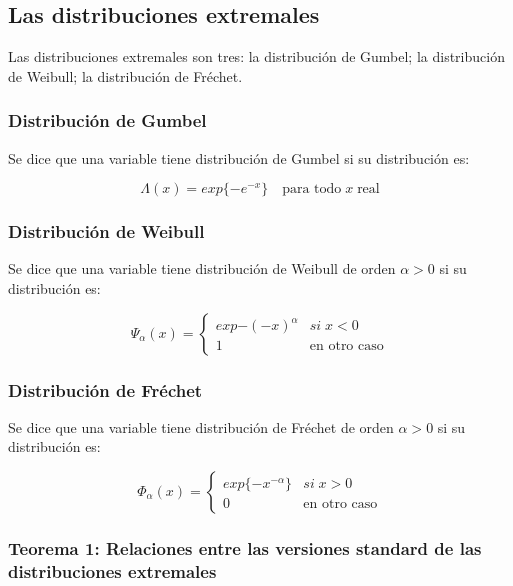 \documentclass[
  12pt]{article}
\begin{document}
\newpage

\hypertarget{las-distribuciones-extremales}{%
\subsection{Las distribuciones
extremales}\label{las-distribuciones-extremales}}

Las distribuciones extremales son tres: la distribución de Gumbel; la
distribución de Weibull; la distribución de Fréchet.

\hypertarget{distribuciuxf3n-de-gumbel}{%
\subsubsection{Distribución de Gumbel}\label{distribuciuxf3n-de-gumbel}}

Se dice que una variable tiene distribución de Gumbel si su distribución
es:

\[ \Lambda(x) = exp\{-e^{-x}\} \quad\text{para todo}\; x \;\text{real} \]

\hypertarget{distribuciuxf3n-de-weibull}{%
\subsubsection{Distribución de
Weibull}\label{distribuciuxf3n-de-weibull}}

Se dice que una variable tiene distribución de Weibull de orden
\(\alpha>0\) si su distribución es:

\[\Psi_{\alpha}(x)=\begin{cases}
exp{-(-x)^{\alpha}} & si\;x<0\\
1 & \text{en otro caso}
\end{cases}\]

\hypertarget{distribuciuxf3n-de-fruxe9chet}{%
\subsubsection{Distribución de
Fréchet}\label{distribuciuxf3n-de-fruxe9chet}}

Se dice que una variable tiene distribución de Fréchet de orden
\(\alpha>0\) si su distribución es:

\[
\Phi_{\alpha}(x)=\begin{cases}
exp\{-x^{-\alpha}\} & si\;x>0\\
0 & \text{en otro caso}
\end{cases}
\] \newpage

\hypertarget{teorema-1-relaciones-entre-las-versiones-standard-de-las-distribuciones-extremales}{%
\subsubsection{Teorema 1: Relaciones entre las versiones standard de las
distribuciones
extremales}\label{teorema-1-relaciones-entre-las-versiones-standard-de-las-distribuciones-extremales}}
\end{document}
